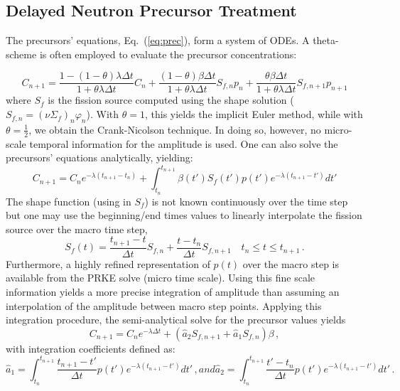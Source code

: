 \documentclass{elsarticle}
\newcommand{\eqt}[1]{Eq.~(\ref{#1})}                     %
\newcommand{\be}{\begin{equation}}
\newcommand{\ee}{\end{equation}}
\begin{document}
\subsection{Delayed Neutron Precursor Treatment}


The precursors' equations, \eqt{eq:prec}, form a system of ODEs. %
A theta-scheme is often employed to evaluate the precursor concentrations:

\be
C_{n+1} = \frac{1-(1-\theta) \lambda\Delta t}{1+\theta \lambda\Delta t}C_n + \frac{(1-\theta) \beta\Delta t}{1+\theta \lambda\Delta t}S_{f,n} p_n +  \frac{\theta \beta\Delta t}{1+\theta \lambda\Delta t}S_{f,n+1} p_{n+1}
\label{eq:dnp_theta}
\ee
where $S_f$ is the fission source computed using the shape solution ($S_{f,n}=(\nu\Sigma_f)_n\varphi_n$). With
$\theta=1$, this yields the implicit Euler method, while with $\theta=\tfrac 1 2$, we obtain the Crank-Nicolson technique. In doing so, however, no micro-scale temporal information for the amplitude is used.
One can also solve the precursors' equations analytically, yielding:
\be
C_{n+1} =  C_n e^{-\lambda (t_{n+1} - t_n) }  + \int_{t_n}^{t_{n+1}} \beta(t') S_f(t') p(t')e^{-\lambda (t_{n+1}-t')}dt'
\label{eq:prec_an}
\ee
The shape function (using in $S_f$) is not known continuously over the time step but one may use the beginning/end times values
to linearly interpolate the fission source over the macro time step,
\be
S_f(t) = \frac{t_{n+1}-t}{\Delta t}S_{f,n}  + \frac{t-t_n}{\Delta t}S_{f,n+1}  \quad t_n \le t \le t_{n+1} \,.
\ee
Furthermore, a highly refined representation of $p(t)$ over the macro step is available from the PRKE solve (micro time scale). 
Using this fine scale information yields a more precise integration of amplitude than assuming an interpolation of the amplitude between macro step points.
Applying this integration procedure, the semi-analytical solve for the precursor values yields
\be
C_{n+1} = C_n e^{-\lambda \Delta t} + \left(\hat{a}_2 S_{f,n+1}+\hat{a}_1 S_{f,n}\right)\beta \,,
\label{eq:dnp_an}
\ee
with integration coefficients defined as:
\begin{subequations}
\be
\hat{a}_1= \int_{t_n}^{t_{n+1}}\frac{t_{n+1}-t'}{\Delta t}p(t')e^{-\lambda(t_{n+1}-t')}dt' \,,
\ee
and
\be
\hat{a}_2 = \int_{t_n}^{t_{n+1}}\frac{t'-t_n}{\Delta t}p(t')e^{-\lambda(t_{n+1}-t')}dt'  \,.
\ee
\end{subequations}
\end{document}
